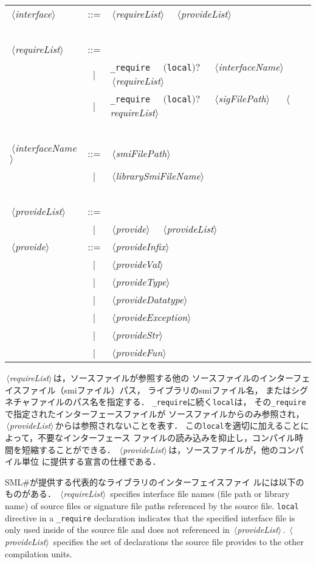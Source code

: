 \documentclass{jbook}
\newcommand{\smlsharp}{SML\#}
\newcommand{\code}[1]{\mbox{\large\tt #1}}
\newcommand{\vbar}{\mbox{\ $|$\ }}
\newcommand{\nonterm}[1]{\mbox{$\,\langle$}{\it #1}\mbox{$\rangle\,$}}
\newcommand{\term}[1]{\mbox{{\tt #1}}}
\newcommand{\optional}[1]{\mbox{$($}{\protect #1}\mbox{$)?$}}
\newcommand{\sep}{\mbox{\ \ }}
\begin{document}
\begin{center}
\begin{tabular}{lcll}
\nonterm{interface} &::=&  \nonterm{requireList}\sep\nonterm{provideList} \\
\ \\
\nonterm{requireList} &::=& \\
&\vbar& \code{\_require}\sep 
    \optional{\code{local}}\sep
    \nonterm{interfaceName}\sep
    \nonterm{requireList}\\
&\vbar& \code{\_require}\sep 
    \optional{\code{local}}\sep
    \nonterm{sigFilePath}\sep
    \nonterm{requireList}\\
\ \\
\nonterm{interfaceName} &::=& 
    \nonterm{smiFilePath}\\
&\vbar& \nonterm{librarySmiFileName}\\
\ \\
\nonterm{provideList} &::=& \\
&\vbar& \nonterm{provide}\sep \nonterm{provideList}\\
\nonterm{provide} &::=& \nonterm{provideInfix}\\
&\vbar& \nonterm{provideVal}\\
&\vbar& \nonterm{provideType}\\
&\vbar& \nonterm{provideDatatype}\\
&\vbar& \nonterm{provideException}\\
&\vbar& \nonterm{provideStr}\\
&\vbar& \nonterm{provideFun}\\
\end{tabular}
\end{center}


\ifjp%
	\nonterm{requireList}は，ソースファイルが参照する他の
ソースファイルのインターフェイスファイル（smiファイル）パス，
ライブラリのsmiファイル名，
またはシグネチャファイルのパス名を指定する．
	\term{\_require}に続く\term{local}は，
その\term{\_require}で指定されたインターフェースファイルが
ソースファイルからのみ参照され，
\nonterm{provideList}からは参照されないことを表す．
	この\term{local}を適切に加えることによって，不要なインターフェース
ファイルの読み込みを抑止し，コンパイル時間を短縮することができる．
	\nonterm{provideList}は，ソースファイルが，他のコンパイル単位
に提供する宣言の仕様である．

	\smlsharp{}が提供する代表的なライブラリのインターフェイスファイ
ルには以下のものがある．
\else%
	\nonterm{requireList} specifies 
interface file names (file path or library name) of
source files  or signature file paths 
referenced by the source file.
	\term{local} directive in a \term{\_require} declaration
indicates that the specified interface file is only used inside of the
source file and does not referenced in  \nonterm{provideList}.
	\nonterm{provideList} specifies the set of declarations 
the source file provides to the other compilation units.
\end{document}
